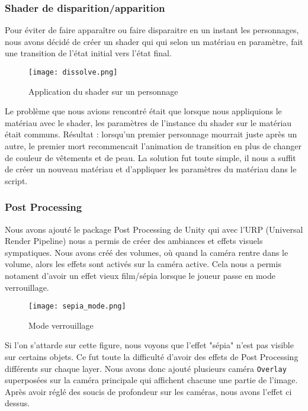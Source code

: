 \subsubsection{Shader de disparition/apparition}
Pour éviter de faire apparaître ou faire disparaitre en un instant les personnages, nous avons décidé de créer un shader qui qui selon un matériau en paramètre, 
fait une transition de l'état initial vers l'état final. 
\begin{figure}[hbt!]
    \centering
    \texttt{[image: dissolve.png]}
    \caption{Application du shader sur un personnage}

\end{figure}
\FloatBarrier

Le problème que nous avions rencontré était que lorsque nous appliquions le matériau avec le shader,
les paramètres de l'instance du shader sur le matériau était communs. Résultat : lorsqu'un premier personnage mourrait juste après un autre, 
le premier mort recommencait l'animation de transition en plus de changer de couleur de vêtements et de peau.
La solution fut toute simple, il nous a suffit de créer un nouveau matériau et d'appliquer les paramètres du matériau dans le script.



\subsubsection{Post Processing}

Nous avons ajouté le package Post Processing de Unity qui avec l'URP (Universal Render Pipeline)
nous a permis de créer des ambiances et effets visuels sympatiques.
Nous avons créé des volumes, où quand la caméra rentre dans le volume, alors les effets sont activés sur la caméra active.
Cela nous a permis notament d'avoir un effet vieux film/sépia lorsque le joueur passe en mode verrouillage.

\begin{figure}[hbt!]
    \centering
    \texttt{[image: sepia\_mode.png]}
    \caption{Mode verrouillage}
\end{figure}
\FloatBarrier


Si l'on s'attarde sur cette figure, nous voyons que l'effet "sépia" n'est pas visible sur certains objets.
Ce fut toute la difficulté d'avoir des effets de Post Processing différents sur chaque layer.
Nous avons donc ajouté plusieurs caméra \texttt{Overlay} superposées sur la caméra principale qui affichent chacune une partie de l'image.
Après avoir réglé des soucis de profondeur sur les caméras, nous avons l'effet ci dessus.